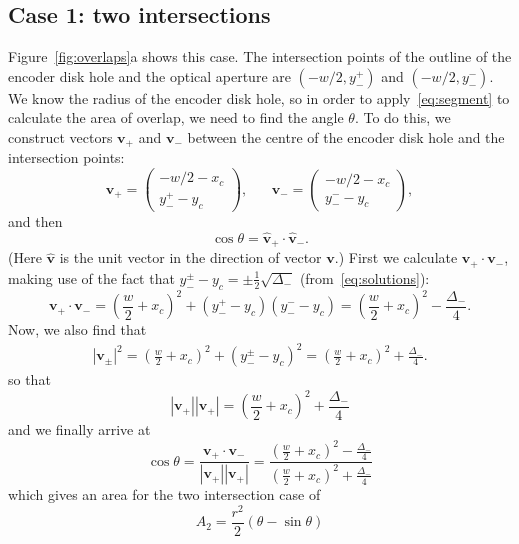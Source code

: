 \documentclass[a4paper,11pt,article]{memoir}
\begin{document}
\subsection*{Case 1: two intersections}

Figure~\ref{fig:overlaps}a shows this case. The intersection points of
the outline of the encoder disk hole and the optical aperture are
$(-w/2, y_{-}^{+})$ and $(-w/2, y_{-}^{-})$. We know the radius of the
encoder disk hole, so in order to apply~\eqref{eq:segment} to
calculate the area of overlap, we need to find the angle $\theta$. To
do this, we construct vectors $\mathbf{v}_{+}$ and $\mathbf{v}_{-}$
between the centre of the encoder disk hole and the intersection
points:
\begin{equation}
  \mathbf{v}_{+} = \begin{pmatrix}
    -w/2 - x_c \\
    y_{-}^{+} - y_c
  \end{pmatrix}, \;\;\;\;\;\;
  \mathbf{v}_{-} = \begin{pmatrix}
    -w/2 - x_c \\
    y_{-}^{-} - y_c
  \end{pmatrix},
\end{equation}
and then
\begin{equation*}
  \cos \theta = \hat{\mathbf{v}}_{+} \cdot \hat{\mathbf{v}}_{-}.
\end{equation*}
(Here $\hat{\mathbf{v}}$ is the unit vector in the direction of vector
$\mathbf{v}$.) First we calculate $\mathbf{v}_{+} \cdot
\mathbf{v}_{-}$, making use of the fact that $y_{-}^{\pm} - y_c = \pm
\frac12 \sqrt{\Delta_{-}}$ (from~\eqref{eq:solutions}):
\begin{equation}
  \mathbf{v}_{+} \cdot \mathbf{v}_{-} = {\left(\frac{w}{2} +
    x_c\right)}^2 + (y_{-}^{+} - y_c) (y_{-}^{-} - y_c) =
         {\left(\frac{w}{2} + x_c\right)}^2 - \frac{\Delta_{-}}{4}.
\end{equation}
Now, we also find that
\begin{align*}
  |\mathbf{v}_{\pm}|^2 = {\left(\frac{w}{2} + x_c\right)}^2 + {(y_{-}^{\pm} -
  y_c)}^2 = {\left(\frac{w}{2} + x_c\right)}^2 + \frac{\Delta_{-}}{4}.
\end{align*}
so that
\begin{equation*}
  |\mathbf{v}_{+}| |\mathbf{v}_{+}| = {\left(\frac{w}{2} +
    x_c\right)}^2 + \frac{\Delta_{-}}{4}
\end{equation*}
and we finally arrive at
\begin{equation*}
  \cos \theta = \frac{\mathbf{v}_{+} \cdot
    \mathbf{v}_{-}}{|\mathbf{v}_{+}| |\mathbf{v}_{+}|} =
  \frac{{\left(\frac{w}{2} + x_c\right)}^2 -
    \frac{\Delta_{-}}{4}}{{\left(\frac{w}{2} + x_c\right)}^2 +
    \frac{\Delta_{-}}{4}}
\end{equation*}
which gives an area for the two intersection case of
\begin{equation*}
  A_2 = \frac{r^2}{2} (\theta - \sin \theta)
\end{equation*}
\end{document}
